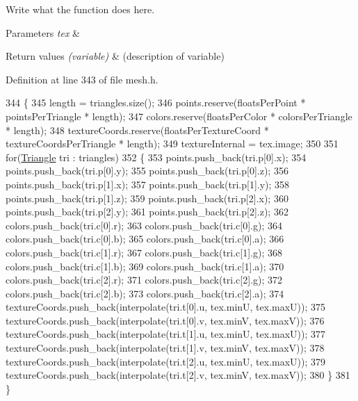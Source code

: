 Write what the function does here. 


\begin{DoxyParams}{Parameters}
{\em tex} & \\
\hline
\end{DoxyParams}

\begin{DoxyRetVals}{Return values}
{\em (variable)} & (description of variable) \\
\hline
\end{DoxyRetVals}


Definition at line 343 of file mesh.\+h.


\begin{DoxyCode}
344         \{
345             length = triangles.size();
346             points.reserve(floatsPerPoint * pointsPerTriangle * length);
347             colors.reserve(floatsPerColor * colorsPerTriangle * length);
348             textureCoords.reserve(floatsPerTextureCoord * textureCoordsPerTriangle * length);
349             textureInternal = tex.image;
350 
351             \textcolor{keywordflow}{for}(\hyperlink{structTriangle}{Triangle} tri : triangles)
352             \{
353                 points.push\_back(tri.p[0].x);
354                 points.push\_back(tri.p[0].y);
355                 points.push\_back(tri.p[0].z);
356                 points.push\_back(tri.p[1].x);
357                 points.push\_back(tri.p[1].y);
358                 points.push\_back(tri.p[1].z);
359                 points.push\_back(tri.p[2].x);
360                 points.push\_back(tri.p[2].y);
361                 points.push\_back(tri.p[2].z);
362                 colors.push\_back(tri.c[0].r);
363                 colors.push\_back(tri.c[0].g);
364                 colors.push\_back(tri.c[0].b);
365                 colors.push\_back(tri.c[0].a);
366                 colors.push\_back(tri.c[1].r);
367                 colors.push\_back(tri.c[1].g);
368                 colors.push\_back(tri.c[1].b);
369                 colors.push\_back(tri.c[1].a);
370                 colors.push\_back(tri.c[2].r);
371                 colors.push\_back(tri.c[2].g);
372                 colors.push\_back(tri.c[2].b);
373                 colors.push\_back(tri.c[2].a);
374                 textureCoords.push\_back(interpolate(tri.t[0].u, tex.minU, tex.maxU));
375                 textureCoords.push\_back(interpolate(tri.t[0].v, tex.minV, tex.maxV));
376                 textureCoords.push\_back(interpolate(tri.t[1].u, tex.minU, tex.maxU));
377                 textureCoords.push\_back(interpolate(tri.t[1].v, tex.minV, tex.maxV));
378                 textureCoords.push\_back(interpolate(tri.t[2].u, tex.minU, tex.maxU));
379                 textureCoords.push\_back(interpolate(tri.t[2].v, tex.minV, tex.maxV));
380             \}
381         \}
\end{DoxyCode}


